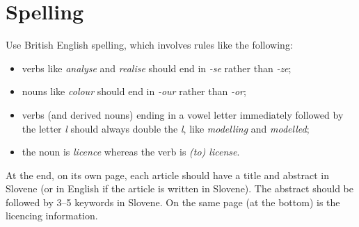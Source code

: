 \documentclass{article}
\begin{document}
\section{Spelling}

Use British English spelling, which involves rules like the following:

    \begin{itemize}
        \item  verbs like \textit{analyse} and \textit{realise} should end in \textit{-se} rather than \textit{-ze};
        \item nouns like \textit{colour} should end in \textit{-our} rather than \textit{-or};
        \item verbs (and derived nouns) ending in a vowel letter immediately followed by the letter \textit{l} should always double the \textit{l}, like \textit{modelling} and \textit{modelled};
        \item the noun is \textit{licence} whereas the verb is \textit{(to) license}.
    \end{itemize}



\printbibliography

\newpage
{}
\begin{abstracteng}
At the end, on its own page, each article should have a title and abstract in Slovene (or in English if the article is written in Slovene). The abstract should be followed by 3--5 keywords in Slovene. On the same page (at the bottom) is the licencing information.
\end{abstracteng}

\end{document}

